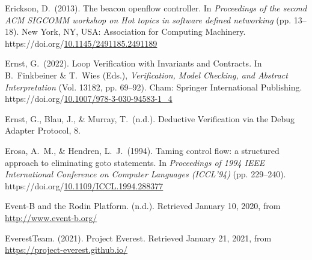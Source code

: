 \documentclass[12pt,twoside]{article}
\begin{document}
{\begin{thebibliography}{1079}
\mdbibitemlabel{}Erickson, D.~(2013). The beacon openflow controller. In \emph{Proceedings of the second ACM SIGCOMM workshop on Hot topics in software defined networking} (pp. 13–18). New York, NY, USA: Association for Computing Machinery. https://doi.org/\href{https://dx.doi.org/10.1145/2491185.2491189}{10.1145/2491185.2491189}%

\mdbibitemlabel{}Ernst, G.~(2022). Loop Verification with Invariants and Contracts. In B.~Finkbeiner \& T.~Wies (Eds.), \emph{Verification, Model Checking, and Abstract Interpretation} (Vol. 13182, pp. 69–92). Cham: Springer International Publishing. https://doi.org/\href{https://dx.doi.org/10.1007/978-3-030-94583-1_4}{10.1007/978-3-030-94583-1\_4}%

\mdbibitemlabel{}Ernst, G., Blau, J., \& Murray, T.~(n.d.). Deductive Verification via the Debug Adapter Protocol, 8.%

\mdbibitemlabel{}Erosa, A.~M., \& Hendren, L.~J.~(1994). Taming control flow: a structured approach to eliminating goto statements. In \emph{Proceedings of 1994 IEEE International Conference on Computer Languages (ICCL’94)} (pp. 229–240). https://doi.org/\href{https://dx.doi.org/10.1109/ICCL.1994.288377}{10.1109/ICCL.1994.288377}%

\mdbibitemlabel{}Event-B and the Rodin Platform. (n.d.). Retrieved January 10, 2020, from \href{http://www.event-b.org/}{{\ttfamily http://\hspace{0pt}www.\hspace{0pt}event-\hspace{0pt}b.\hspace{0pt}org/\hspace{0pt}}}%

\mdbibitemlabel{}EverestTeam. (2021). Project Everest. Retrieved January 21, 2021, from \href{https://project-everest.github.io/}{{\ttfamily https://\hspace{0pt}project-\hspace{0pt}everest.\hspace{0pt}github.\hspace{0pt}io/\hspace{0pt}}}%


\end{thebibliography}}
\end{document}
